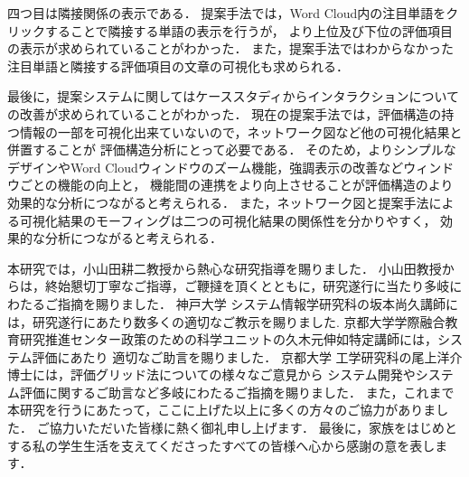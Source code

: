 \documentclass[syuuron]{kuee}
\begin{document}
		四つ目は隣接関係の表示である．
		提案手法では，Word Cloud内の注目単語をクリックすることで隣接する単語の表示を行うが，
		より上位及び下位の評価項目の表示が求められていることがわかった．
		また，提案手法ではわからなかった注目単語と隣接する評価項目の文章の可視化も求められる．
		
		最後に，提案システムに関してはケーススタディからインタラクションについての改善が求められていることがわかった．
		現在の提案手法では，評価構造の持つ情報の一部を可視化出来ていないので，ネットワーク図など他の可視化結果と併置することが
		評価構造分析にとって必要である．
		そのため，よりシンプルなデザインやWord Cloudウィンドウのズーム機能，強調表示の改善などウィンドウごとの機能の向上と，
		機能間の連携をより向上させることが評価構造のより効果的な分析につながると考えられる．
		また，ネットワーク図と提案手法による可視化結果のモーフィングは二つの可視化結果の関係性を分かりやすく，
		効果的な分析につながると考えられる．

\begin{acknowledgements}
	本研究では，小山田耕二教授から熱心な研究指導を賜りました．
	小山田教授からは，終始懇切丁寧なご指導，ご鞭撻を頂くとともに，研究遂行に当たり多岐にわたるご指摘を賜りました．
	神戸大学 システム情報学研究科の坂本尚久講師には，研究遂行にあたり数多くの適切なご教示を賜りました.
	京都大学学際融合教育研究推進センター政策のための科学ユニットの久木元伸如特定講師には，システム評価にあたり
	適切なご助言を賜りました．
	京都大学 工学研究科の尾上洋介博士には，評価グリッド法についての様々なご意見から
	システム開発やシステム評価に関するご助言など多岐にわたるご指摘を賜りました．
	また，これまで本研究を行うにあたって，ここに上げた以上に多くの方々のご協力がありました．
	ご協力いただいた皆様に熱く御礼申し上げます．
	最後に，家族をはじめとする私の学生生活を支えてくださったすべての皆様へ心から感謝の意を表します．
\end{acknowledgements}
\end{document}
